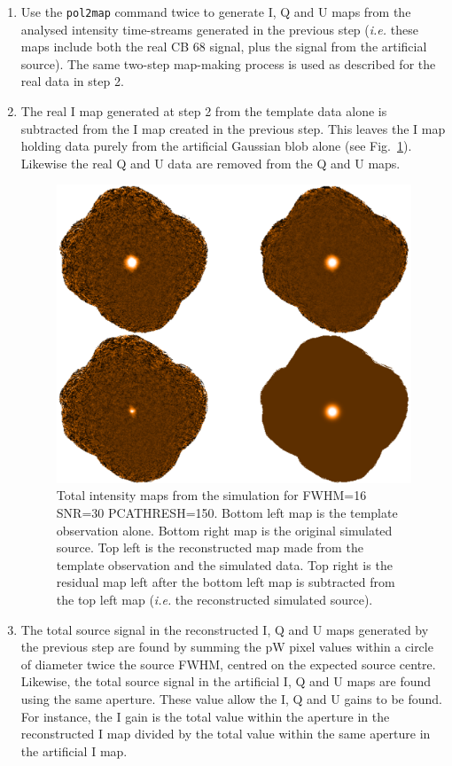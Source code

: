 \documentclass[twoside,11pt]{starlink}
\begin{document}
\begin{enumerate}
\item Use the \texttt{pol2map} command twice to generate I, Q and U
maps from the analysed intensity time-streams generated in the previous
step (\emph{i.e.} these maps include both the real CB 68 signal, plus the
signal from the artificial source). The same two-step map-making process is
used as described for the real data in step 2.

\item The real I map generated at step 2 from the template data alone is
subtracted from the I map created in the previous step. This leaves the I
map holding data purely from the artificial Gaussian blob alone (see
Fig.~\ref{fig:icor}). Likewise the real Q and U data are removed from the
Q and U maps.

\begin{figure}
\includegraphics[width=0.9\columnwidth]{figs/icor}
\caption{Total intensity maps from the simulation for FWHM=16 SNR=30
PCATHRESH=150. Bottom left map is the template observation alone. Bottom
right map is the original simulated source. Top left is the reconstructed
map made from the template observation and the simulated data. Top right
is the residual map left after the bottom left map is subtracted from the
top left map (\emph{i.e.} the reconstructed simulated source). }
\label{fig:icor}
\end{figure}

\item The total source signal in the reconstructed I, Q and U maps generated by the
previous step are found by summing the pW pixel values within a circle of
diameter twice the source FWHM, centred on the expected source centre.
Likewise, the  total source signal in the artificial  I, Q and U maps are
found using the same aperture. These value allow the I, Q and U gains to
be found. For instance, the I gain is the total value within the aperture
in the reconstructed I map divided by the  total value within the same aperture
in the artificial I map.


\end{enumerate}
\end{document}
